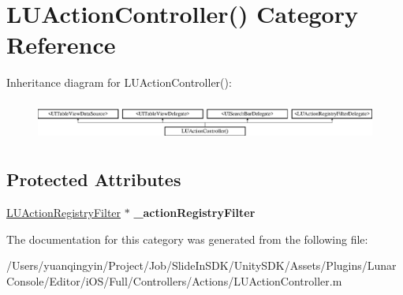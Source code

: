\hypertarget{category_l_u_action_controller_07_08}{}\section{L\+U\+Action\+Controller() Category Reference}
\label{category_l_u_action_controller_07_08}
Inheritance diagram for L\+U\+Action\+Controller()\+:\begin{figure}[H]
\begin{center}
\leavevmode
\includegraphics[height=1.333333cm]{category_l_u_action_controller_07_08}
\end{center}
\end{figure}
\subsection*{Protected Attributes}
\begin{DoxyCompactItemize}
\item 
\mbox{\label{category_l_u_action_controller_07_08_ac1b593f8e44b48af610dc7d9ea9b8196}} 
\mbox{\hyperlink{interface_l_u_action_registry_filter}{L\+U\+Action\+Registry\+Filter}} $\ast$ {\bfseries \+\_\+action\+Registry\+Filter}
\end{DoxyCompactItemize}


The documentation for this category was generated from the following file\+:\begin{DoxyCompactItemize}
\item 
/\+Users/yuanqingyin/\+Project/\+Job/\+Slide\+In\+S\+D\+K/\+Unity\+S\+D\+K/\+Assets/\+Plugins/\+Lunar\+Console/\+Editor/i\+O\+S/\+Full/\+Controllers/\+Actions/L\+U\+Action\+Controller.\+m\end{DoxyCompactItemize}
